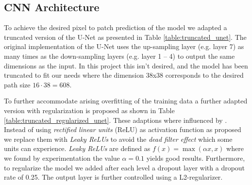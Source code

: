 \documentclass[10pt,conference,compsocconf]{IEEEtran}
\begin{document}
\subsection{CNN Architecture}

To achieve the desired pixel to patch prediction of the model we adapted a truncated version of the U-Net \cite{Ronneberger2015} as presented in Table \ref{table:truncated_unet}. The original implementation of the U-Net uses the up-sampling layer (e.g. layer 7) as many times as the down-sampling layers (e.g. layer 1 – 4) to output the same dimensions as the input. In this project this isn't desired, and the model has been truncated to fit our needs where the dimension 38x38 corresponds to the desired path size $16 \cdot 38= 608$.

To further accommodate arising overfitting of the training data a further adapted version with regularization is proposed as shown in Table \ref{table:truncated_regularized_unet}. These adaptions where influenced by \cite{Pavllo2017}. Instead of using \textit{rectified linear units} (ReLU) as activation function as proposed we replace them with \textit{Leaky ReLUs} to avoid the \textit{dead filter effect} which some units can experience. \textit{Leaky ReLUs} are defined as $f(x) = \max(\alpha x, x)$ where we found by experimentation the value $\alpha=0.1$ yields good results. Furthermore, to regularize the model we added after each level a dropout layer with a dropout rate of 0.25. The output layer is further controlled using a L2-regularizer.
\end{document}
